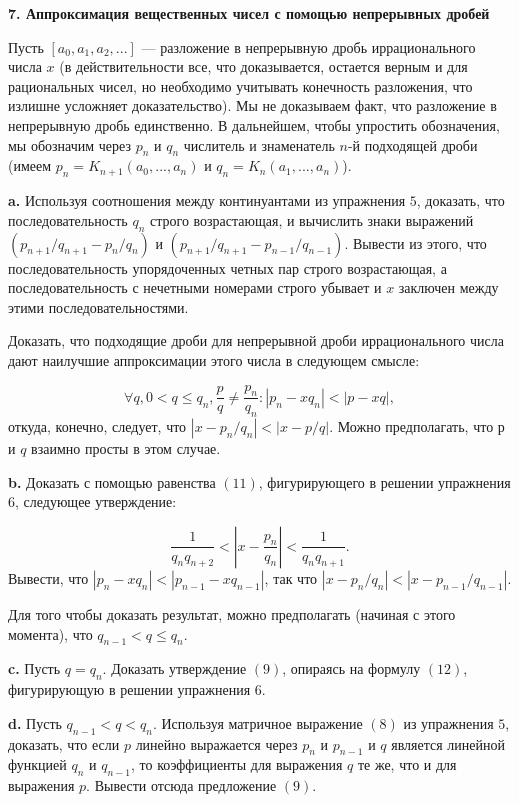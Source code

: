 \documentclass{mai_book}
\begin{document}
\noindent \textbf{7. Аппроксимация вещественных чисел с помощью
непрерывных дробей}

Пусть $[a_0,a_1,a_2,...]$ — разложение в непрерывную дробь 
иррационального числа $x$ (в действительности все, что доказывается, 
остается верным и для рациональных чисел, но необходимо учитывать 
конечность разложения, что излишне усложняет доказательство). Мы не
доказываем факт, что разложение в непрерывную дробь 
единственно. В дальнейшем, чтобы упростить обозначения, мы обозначим 
через $p_n$ и $q_n$ числитель и знаменатель $n$-й подходящей дроби (имеем
$p_n = K_{n+1}(a_0,...,a_n)$ и $q_n = K_n(a_1,...,a_n)$).

\textbf{a.} Используя соотношения между континуантами из упражнения $5$,
доказать, что последовательность $q_n$ строго возрастающая, и 
вычислить знаки выражений $(p_{n+1}/q_{n+1} - p_n/q_n)$ и $(p_{n+1}/q_{n+1} -p_{n-1}/q_{n-1})$. Вывести из этого, что последовательность упорядоченных четных пар строго возрастающая, а последовательность с нечетными номерами
строго убывает и $x$ заключен между этими последовательностями.

Доказать, что подходящие дроби для непрерывной дроби 
иррационального числа дают наилучшие аппроксимации этого числа в 
следующем смысле:

\[
\forall q, 0<q \le q_n, \frac{p}{q} \ne \frac{p_n}{q_n}: |p_n-xq_n|<|p-xq|,
\]
откуда, конечно, следует, что $|x-p_n/q_n|<|x-p/q|$. Можно 
предполагать, что $р$ и $q$ взаимно просты в этом случае.

\textbf{b.} Доказать с помощью равенства $(11)$, фигурирующего в решении
упражнения $6$, следующее утверждение:

\[
\frac{1}{q_nq_{n+2}}<|x-\frac{p_n}{q_n}|<\frac{1}{q_nq_{n+1}}.
\]
Вывести, что $|p_n-xq_n| < |p_{n-1}-xq_{n-1}|$, так что $|x-p_n/q_n|<|x-p_{n-1}/q_{n-1}|$.

Для того чтобы доказать результат, можно предполагать (начиная
с этого момента), что $q_{n-1} < q \le q_n$.

\textbf{c.} Пусть $q = q_n$. Доказать утверждение $(9)$, опираясь на 
формулу $(12)$, фигурирующую в решении упражнения $6$.

\textbf{d.} Пусть $q_{n-1}<q<q_n$. Используя матричное выражение $(8)$ из
упражнения $5$, доказать, что если $p$ линейно выражается через $p_n$ и
$p_{n-1}$ и $q$ является линейной функцией $q_n$ и $q_{n-1}$, то коэффициенты для выражения $q$ те же, что и для выражения $p$. Вывести отсюда 
предложение $(9)$.
\end{document}
